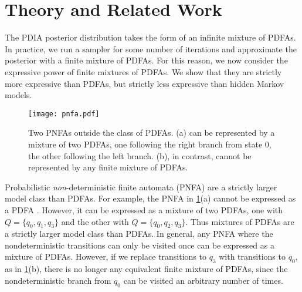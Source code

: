\section{Theory and Related Work}
\label{sec:theory}

The PDIA posterior distribution takes the form of an infinite mixture of PDFAs.  In practice, we run a sampler for some number of iterations and approximate the posterior with a finite mixture of PDFAs.  For this reason, we now consider the expressive power of finite mixtures of PDFAs.  We show that they are strictly more expressive than PDFAs, but strictly less expressive than hidden Markov models.
%
%
\begin{figure}[t]
\begin{center}
\texttt{[image: pnfa.pdf]}
\caption{Two PNFAs outside the class of PDFAs.  (a) can be represented by a mixture of two PDFAs, one following the right branch from state 0, the other following the left branch.  (b), in contrast, cannot be represented by any finite mixture of PDFAs.}
\label{pnfa}
\end{center}
\end{figure}
%
Probabilistic {\em non}-deterministic finite automata (PNFA) are a strictly larger model class than PDFAs.  For example, the PNFA in \ref{pnfa}(a) cannot be expressed as a PDFA \cite{Dupont2005}.  However, it can be expressed as a mixture of two PDFAs, one with $Q = \{q_0,q_1,q_3\}$ and the other with $Q = \{q_0,q_2,q_3\}$.  Thus mixtures of PDFAs are a strictly larger model class than PDFAs.  In general, any PNFA where the nondeterministic transitions can only be visited once can be expressed as a mixture of PDFAs.  However, if we replace transitions to $q_3$ with transitions to $q_0$, as in \ref{pnfa}(b), there is no longer any equivalent finite mixture of PDFAs, since the nondeterministic branch from $q_0$ can be visited an arbitrary number of times.    
%

